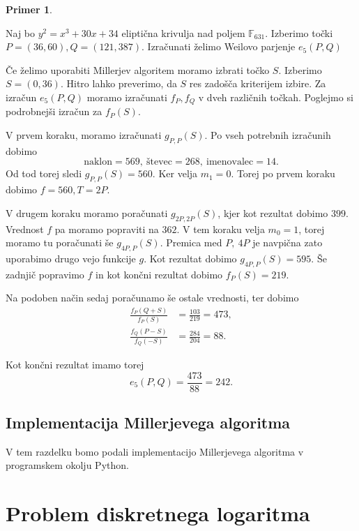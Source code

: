 \documentclass[12pt,a4paper,twoside]{article}
\theoremstyle{definition} %
\newtheorem{primer}[definicija]{Primer}
\theoremstyle{plain} %
\numberwithin{equation}{section}  %
\newcommand{\F}{\mathbb F}
\begin{document}
\begin{primer}~

Naj bo $y^2 = x^3+30x+34$ eliptična krivulja nad poljem $\F_{631}$. Izberimo točki $P = (36,60),Q = (121,387)$. Izračunati želimo Weilovo parjenje $e_5(P,Q)$

Če želimo uporabiti Millerjev algoritem moramo izbrati točko $S$. Izberimo $S=(0,36)$. Hitro lahko preverimo, da $S$ res zadošča kriterijem izbire.
Za izračun $e_5(P,Q)$ moramo izračunati $f_P,f_Q$ v dveh različnih točkah. Poglejmo si podrobnejši izračun za $f_P(S)$.

V prvem koraku, moramo izračunati $g_{P,P}(S)$. Po vseh potrebnih izračunih dobimo $$\text{naklon} = 569,\ \text{števec} = 268,\ \text{imenovalec} = 14.$$ Od tod torej sledi $g_{P,P}(S) = 560$. Ker velja $m_1 = 0$. Torej po prvem koraku dobimo $f = 560, T = 2P$.

V drugem koraku moramo poračunati $g_{2P,2P}(S)$, kjer kot rezultat dobimo $399$. Vrednost $f$ pa moramo popraviti na $362$. V tem koraku velja $m_0 = 1$, torej moramo tu poračunati še
$g_{4P,P}(S)$. Premica med $P,\ 4P$ je navpična zato uporabimo drugo vejo funkcije $g$. Kot rezultat dobimo $g_{4P,P}(S) = 595$. Še zadnjič popravimo $f$ in kot končni rezultat dobimo
$f_P(S) = 219$.

Na podoben način sedaj poračunamo še ostale vrednosti, ter dobimo
\begin{align}
\frac{f_P(Q+S)}{f_P(S)} &{}= \frac{103}{219} = 473, \nonumber \\
\frac{f_Q(P-S)}{f_Q(-S)} &{}= \frac{284}{204} = 88. \nonumber
\end{align}

Kot končni rezultat imamo torej
$$e_5(P,Q) =\frac{473}{88} = 242.$$

\end{primer}

\subsection{Implementacija Millerjevega algoritma}
V tem razdelku bomo podali implementacijo Millerjevega algoritma v programskem okolju Python.



\newpage

\section{Problem diskretnega logaritma}
\end{document}
